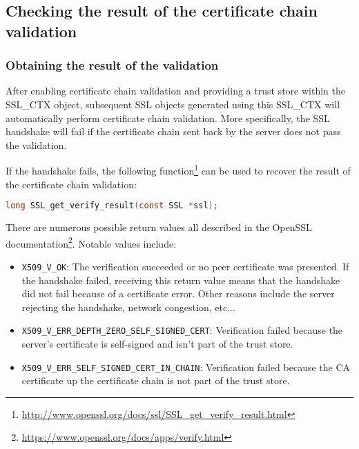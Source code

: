 \documentclass{article}
\begin{document}
\subsection{Checking the result of the certificate chain validation}

\subsubsection{Obtaining the result of the validation}

After enabling certificate chain validation and providing a trust store within
the SSL\_CTX object, subsequent SSL objects generated using this SSL\_CTX will
automatically perform certificate chain validation. More specifically, the SSL
handshake will fail if the certificate chain sent back by the server does not
pass the validation.

If the handshake fails, the following 
function\footnote{\url{http://www.openssl.org/docs/ssl/SSL_get_verify_result.html}}
can be used to recover the result of the certificate chain validation:

\begin{lstlisting}[style=code,language=C,numbers=none,caption={}]
long SSL_get_verify_result(const SSL *ssl);
\end{lstlisting}

There are numerous possible return values all described in the OpenSSL 
documentation\footnote{\url{https://www.openssl.org/docs/apps/verify.html}}.
Notable values include:

\begin{itemize}

    \item {\tt X509\_V\_OK}: The verification succeeded or no peer
        certificate was presented. If the handshake failed, receiving this
        return value means that the handshake did not fail because of a
        certificate error. Other reasons include the server rejecting the
        handshake, network congestion, etc...

    \item {\tt X509\_V\_ERR\_DEPTH\_ZERO\_SELF\_SIGNED\_CERT}:
        Verification failed because the server's certificate is self-signed and
        isn't part of the trust store.

    \item {\tt X509\_V\_ERR\_SELF\_SIGNED\_CERT\_IN\_CHAIN}:
        Verification failed because the CA certificate up the certificate chain
        is not part of the trust store.

\end{itemize}
\end{document}

